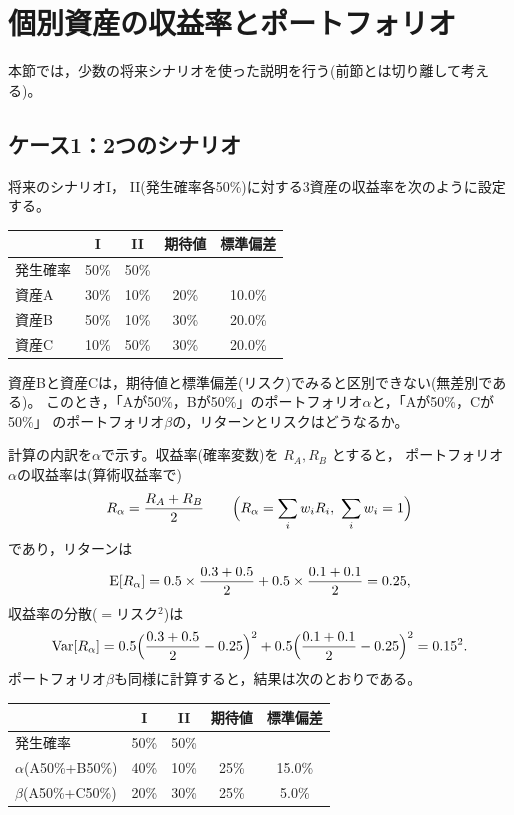\section{個別資産の収益率とポートフォリオ}

本節では，少数の将来シナリオを使った説明を行う(前節とは切り離して考える)。

\subsection{ケース1：2つのシナリオ}

\begin{example}[基礎データ]
将来のシナリオI， II(発生確率各50\%)に対する3資産の収益率を次のように設定する。
\vspace{0.9em}
\begin{center}
\begin{tabular}{lcccc}
\toprule
 & I & II & 期待値 & 標準偏差\\
\midrule
発生確率 & 50\% & 50\% & &\\
資産A & 30\% & 10\% & 20\% & 10.0\%\\
資産B & 50\% & 10\% & 30\% & 20.0\%\\
資産C & 10\% & 50\% & 30\% & 20.0\%\\
\bottomrule
\end{tabular}
\end{center}
\vspace{0.9em}
資産Bと資産Cは，期待値と標準偏差(リスク)でみると区別できない(無差別である)。
このとき，「Aが50\%，Bが50\%」のポートフォリオ$\alpha$と，「Aが50\%，Cが50\%」
のポートフォリオ$\beta$の，リターンとリスクはどうなるか。
\end{example}

計算の内訳を$\alpha$で示す。収益率(確率変数)を $R_A, R_B$ とすると，
ポートフォリオ$\alpha$の収益率は(算術収益率で)
\[
R_\alpha = \frac{R_A + R_B}{2}
\qquad\Bigl(R_\alpha = \sum_i w_i R_i,\ \sum_i w_i = 1\Bigr)
\]
であり，リターンは
\[
\mathrm{E}[R_\alpha] = 0.5\times\frac{0.3+0.5}{2} + 0.5\times\frac{0.1+0.1}{2} = 0.25,
\]
収益率の分散($=$リスク$^2$)は
\[
\mathrm{Var}[R_\alpha] = 0.5\Bigl(\frac{0.3+0.5}{2}-0.25\Bigr)^2
+ 0.5\Bigl(\frac{0.1+0.1}{2}-0.25\Bigr)^2 = 0.15^2.
\]
ポートフォリオ$\beta$も同様に計算すると，結果は次のとおりである。

\vspace{0.9em}
\begin{center}
\begin{tabular}{lcccc}
\toprule
 & I & II & 期待値 & 標準偏差\\
\midrule
発生確率 & 50\% & 50\% & &\\
$\alpha$(A50\%+B50\%) & 40\% & 10\% & 25\% & 15.0\%\\
$\beta$(A50\%+C50\%) & 20\% & 30\% & 25\% & 5.0\%\\
\bottomrule
\end{tabular}
\end{center}
\vspace{0.9em}

